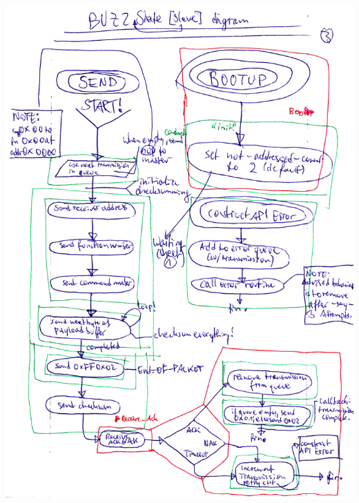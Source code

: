 \documentclass[12pt,a4paper,notitlepage]{article}
\begin{document}
\begin{center}
\includegraphics[width=\textwidth]{images/image1_enhanced_small.png}
\newpage

\end{center}
\end{document}
